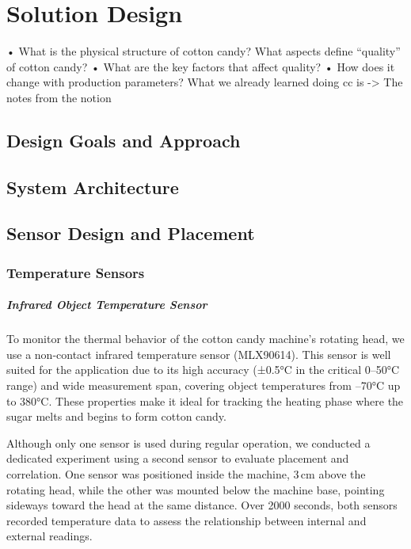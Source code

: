 \chapter{Solution Design}
\label{sec:solution}

    •	What is the physical structure of cotton candy?
    What aspects define “quality” of cotton candy?     •	What are the key factors that affect quality?
    •	How does it change with production parameters?
    What we already learned doing cc is -> The notes from the notion

\section{Design Goals and Approach}

\section{System Architecture}

\section{Sensor Design and Placement}
\subsection{Temperature Sensors}


\paragraph{Infrared Object Temperature Sensor}
To monitor the thermal behavior of the cotton candy machine's rotating head, we use a non-contact infrared temperature sensor (MLX90614). This sensor is well suited for the application due to its high accuracy (±0.5°C in the critical 0–50°C range) and wide measurement span, covering object temperatures from --70°C up to 380°C. These properties make it ideal for tracking the heating phase where the sugar melts and begins to form cotton candy.

Although only one sensor is used during regular operation, we conducted a dedicated experiment using a second sensor to evaluate placement and correlation. One sensor was positioned inside the machine, 3 cm above the rotating head, while the other was mounted below the machine base, pointing sideways toward the head at the same distance. Over 2000 seconds, both sensors recorded temperature data to assess the relationship between internal and external readings.

